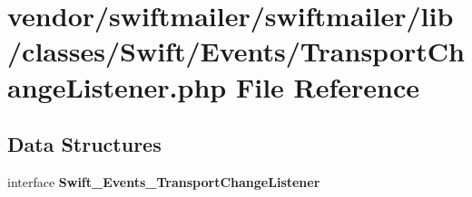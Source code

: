 \section{vendor/swiftmailer/swiftmailer/lib/classes/\+Swift/\+Events/\+Transport\+Change\+Listener.php File Reference}
\label{_transport_change_listener_8php}
\subsection*{Data Structures}
\begin{DoxyCompactItemize}
\item 
interface {\bf Swift\+\_\+\+Events\+\_\+\+Transport\+Change\+Listener}
\end{DoxyCompactItemize}
